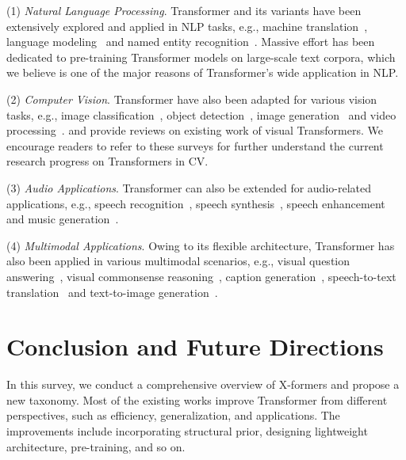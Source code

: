\documentclass[manuscript,acmsmall,screen,nonacm]{acmart}
\theoremstyle{definition}
\begin{document}
(1) \textit{Natural Language Processing}. Transformer and its variants have been extensively explored and applied in NLP tasks, e.g., machine translation~\cite{vaswani2017attention,mehta2020delight,raffel2020t5,so19evolvedxformer,fan-etal-2021-mask}, language modeling~\cite{dai2019transformerxl,shoeybi2020megatronlm,roy2020efficient,rae2019compressive} and named entity recognition~\cite{yan2019tener,li-etal-2020-flat}. Massive effort has been dedicated to pre-training Transformer models on large-scale text corpora, which we believe is one of the major reasons of Transformer's wide application in NLP.

(2) \textit{Computer Vision}. Transformer have also been adapted for various vision tasks, e.g., image classification~\cite{chen20igpt,dosovitskiy2020vit,liu2021swin}, object detection~\cite{carion20detr,zhu20deformabledetr,zheng20adaptiveclustering,liu2021swin}, image generation~\cite{parmar2018imagexformer,jiang2021transgan} and video processing~\cite{Shao_2021_WACV,arnab2021vivit}. \citet{han2021surveyvisualxformer} and \citet{khan2021xformersinvision} provide reviews on existing work of visual Transformers. We encourage readers to refer to these surveys for further understand the current research progress on Transformers in CV.

(3) \textit{Audio Applications}. Transformer can also be extended for audio-related applications, e.g., speech recognition~\cite{dong18speechxformer,pham19deepsanspeech,chen20streamingxformer,gulati20conformer}, speech synthesis~\cite{li19xformertts,zheng20rnnenhancedxformer,ihm20reformertts}, speech enhancement~\cite{kim20tgsa,yu21se-xformer} and music generation~\cite{huang2018music}.

(4) \textit{Multimodal Applications}. Owing to its flexible architecture, Transformer has also been applied in various multimodal scenarios, e.g., visual question answering~\cite{li2019visualbert,Hu_2020_CVPR,su20vlbert,li2020unimo}, visual commonsense reasoning~\cite{li2019visualbert,su20vlbert}, caption generation~\cite{sun19videobert,cornia20meshedmemxformer,lin2021m6}, speech-to-text translation~\cite{han2021chimera} and text-to-image generation~\cite{ramesh2021dalle,lin2021m6,ding2021cogview}.

\section{Conclusion and Future Directions}\label{sec:discussion}

In this survey, we conduct a comprehensive overview of X-formers and propose a new taxonomy. Most of the existing works improve Transformer from different perspectives, such as efficiency, generalization, and applications. The improvements include incorporating structural prior, designing lightweight architecture, pre-training, and so on.
\end{document}
